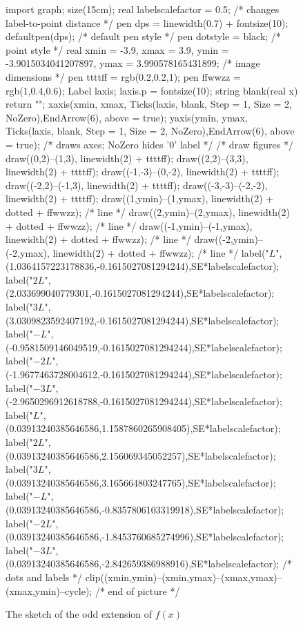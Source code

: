 \documentclass[12pt]{scrartcl}
\begin{document}
\begin{soln}
\begin{figure}[H]
	\centering
	\begin{asy}
	import graph; size(15cm); 
real labelscalefactor = 0.5; /* changes label-to-point distance */
pen dps = linewidth(0.7) + fontsize(10); defaultpen(dps); /* default pen style */ 
pen dotstyle = black; /* point style */ 
real xmin = -3.9, xmax = 3.9, ymin = -3.9015034041207897, ymax = 3.990578165431899;  /* image dimensions */
pen ttttff = rgb(0.2,0.2,1); pen ffwwzz = rgb(1,0.4,0.6); 
Label laxis; laxis.p = fontsize(10); 
string blank(real x) {return "";} 
xaxis(xmin, xmax, Ticks(laxis, blank, Step = 1, Size = 2, NoZero),EndArrow(6), above = true); 
yaxis(ymin, ymax, Ticks(laxis, blank, Step = 1, Size = 2, NoZero),EndArrow(6), above = true); /* draws axes; NoZero hides '0' label */ 
 /* draw figures */
draw((0,2)--(1,3), linewidth(2) + ttttff); 
draw((2,2)--(3,3), linewidth(2) + ttttff); 
draw((-1,-3)--(0,-2), linewidth(2) + ttttff); 
draw((-2,2)--(-1,3), linewidth(2) + ttttff); 
draw((-3,-3)--(-2,-2), linewidth(2) + ttttff); 
draw((1,ymin)--(1,ymax), linewidth(2) + dotted + ffwwzz); /* line */
draw((2,ymin)--(2,ymax), linewidth(2) + dotted + ffwwzz); /* line */
draw((-1,ymin)--(-1,ymax), linewidth(2) + dotted + ffwwzz); /* line */
draw((-2,ymin)--(-2,ymax), linewidth(2) + dotted + ffwwzz); /* line */
label("$L$",(1.0364157223178836,-0.1615027081294244),SE*labelscalefactor); 
label("$2L$",(2.033699040779301,-0.1615027081294244),SE*labelscalefactor); 
label("$3L$",(3.0309823592407192,-0.1615027081294244),SE*labelscalefactor); 
label("$-L$",(-0.9581509146049519,-0.1615027081294244),SE*labelscalefactor); 
label("$-2L$",(-1.9677463728004612,-0.1615027081294244),SE*labelscalefactor); 
label("$-3L$",(-2.9650296912618788,-0.1615027081294244),SE*labelscalefactor); 
label("$L$",(0.03913240385646586,1.1587860265908405),SE*labelscalefactor); 
label("$2L$",(0.03913240385646586,2.156069345052257),SE*labelscalefactor); 
label("$3L$",(0.03913240385646586,3.165664803247765),SE*labelscalefactor); 
label("$-L$",(0.03913240385646586,-0.8357806103319918),SE*labelscalefactor); 
label("$-2L$",(0.03913240385646586,-1.8453760685274996),SE*labelscalefactor); 
label("$-3L$",(0.03913240385646586,-2.842659386988916),SE*labelscalefactor); 
 /* dots and labels */
clip((xmin,ymin)--(xmin,ymax)--(xmax,ymax)--(xmax,ymin)--cycle); 
 /* end of picture */
\end{asy}
\caption{The sketch of the odd extension of $f(x)$}
\end{figure}


\end{soln}
\end{document}
